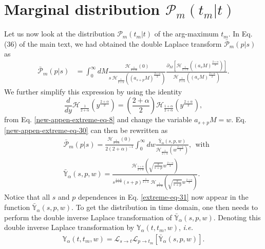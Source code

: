 \documentclass[superscriptaddress,amsmath,amssymb,aps,onecolumn]{revtex4}
\begin{document}
\section{Marginal distribution $\mathcal{P}_m(t_m|t)$}
\label{ILTYY}
Let us now look at the distribution $\mathcal{P}_m(t_m|t)$ of the arg-maximum $t_m$. In Eq. (36) of the main text, we had obtained the double Laplace transform $\bar{\mathcal{P}}_m(p|s)$ as
\begin{align}
\bar{\mathcal{P}}_m(p|s) &= \int _{0}^{\infty} dM \frac{  \mathcal{H}_{\frac{1}{2+\alpha}} \left(0 \right) }{s~\mathcal{H}_{\frac{1}{2+\alpha}} \left( (a_{s+p} M)^{\frac{2+\alpha}{2}} \right)}
 \frac{\partial _M \left[ \mathcal{H}_{\frac{1}{2+\alpha}} \left( (a_s M)^{\frac{2+\alpha}{2}} \right) \right]}{ \mathcal{H}_{\frac{1}{2+\alpha}} \left( (a_s M)^{\frac{2+\alpha}{2}} \right)}.
\label{new-appen-extreme-eq-30}
\end{align}
We further simplify this expression by using the identity
$$\frac{d}{dy}  \mathcal{H}_{\frac{1}{2+\alpha}} \left( y^{\frac{2+\alpha}{2}} \right) = \left(\frac{2+\alpha}{2}\right) \mathcal{H}_{\frac{1+\alpha}{2+\alpha}} \left( y^{\frac{2+\alpha}{2}} \right), $$
from Eq. \eqref{new-appen-extreme-eq-8} and change the variable $a_{s+p} M=w$. Eq. \eqref{new-appen-extreme-eq-30} can then be rewritten as
\begin{align}
&\bar{\mathcal{P}}_m(p|s) = \frac{ \mathcal{H}_{\frac{1}{2+\alpha}} \left(0 \right) }{2 (2+\alpha)^{-1}} \int _{0}^{\infty} dw \frac{\bar{\mathbb{Y}}_{\alpha} \left(s,p,w \right)}{\mathcal{H}_{\frac{1}{2+\alpha}} \left(w^{\frac{2+\alpha}{2}} \right)}, ~~\text{with}\label{extreme-eq-31}\\
& \bar{\mathbb{Y}}_{\alpha} \left(s,p,w \right) = \frac{\mathcal{H}_{\frac{1+\alpha}{2+\alpha}} \left(\sqrt{\frac{s}{s+p}}w^{\frac{2+\alpha}{2}} \right)}{s^{\frac{1+\alpha}{2+\alpha}}(s+p)^{\frac{1}{2+\alpha}}~\mathcal{H}_{\frac{1}{2+\alpha}} \left(\sqrt{\frac{s}{s+p}}w^{\frac{2+\alpha}{2}} \right)}.\label{extreme-eq-32}
\end{align} 
Notice that all $s$ and $p$ dependences in Eq. \eqref{extreme-eq-31} now appear in the function $\bar{\mathbb{Y}}_{\alpha} \left(s,p,w \right) $. To get the distribution in time domain, one then needs to perform the double inverse Laplace transformation of $\bar{\mathbb{Y}}_{\alpha} \left(s,p,w \right)$. Denoting this double inverse Laplace transformation by $\mathbb{Y}_{\alpha} \left(t,t_m,w \right)$, \textit{i.e.} 
\begin{align}
\mathbb{Y}_{\alpha} \left(t,t_m,w \right) = \mathcal{L}_{s \to t}\mathcal{L}_{p \to t_m} \left[ \bar{\mathbb{Y}}_{\alpha} \left(s,p,w \right) \right].
\label{appen-ILTYY-eq-2}
\end{align}
\end{document}
